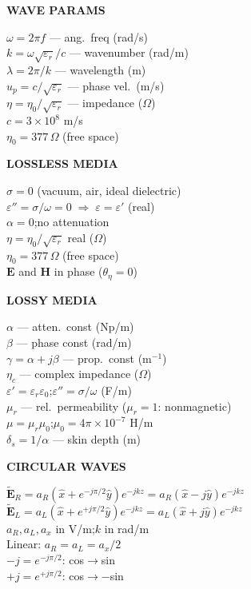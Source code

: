 \documentclass[6pt,letterpaper]{article}
\newcommand{\shead}[3]{%
  \noindent\colorbox{#1}{\parbox{\dimexpr\linewidth-2\fboxsep\relax}%
  {\color{#2}\bfseries\fontsize{6}{7}\selectfont #3}}\vspace{0.5pt}}
\begin{document}
\vfill
\noindent
\begin{minipage}[t]{0.19\linewidth}
\shead{purplebg}{purple}{WAVE PARAMS}
\begin{ebox}
$\omega=2\pi f$ --- ang.\ freq (rad/s)\\
$k=\omega\sqrt{\varepsilon_r}/c$ --- wavenumber (rad/m)\\
$\lambda=2\pi/k$ --- wavelength (m)\\
$u_p=c/\sqrt{\varepsilon_r}$ --- phase vel.\ (m/s)\\
$\eta=\eta_0/\sqrt{\varepsilon_r}$ --- impedance ($\Omega$)\\
$c=3\times10^8$ m/s\\
\textbf{$\eta_0=377\,\Omega$} (free space)
\end{ebox}
\end{minipage}\hfill
\begin{minipage}[t]{0.19\linewidth}
\shead{purplebg}{purple}{LOSSLESS MEDIA}
\begin{ebox}
$\sigma=0$ (vacuum, air, ideal dielectric)\\
$\varepsilon''=\sigma/\omega=0\;\Rightarrow\;\varepsilon=\varepsilon'$ (real)\\
$\alpha=0$;\enspace no attenuation\\
$\eta=\eta_0/\sqrt{\varepsilon_r}$ real ($\Omega$)\\
$\eta_0=377\,\Omega$ (free space)\\
$\mathbf{E}$ and $\mathbf{H}$ in phase ($\theta_\eta=0$)
\end{ebox}
\end{minipage}\hfill
\begin{minipage}[t]{0.19\linewidth}
\shead{coralbg}{coral}{LOSSY MEDIA}
\begin{ebox}
$\alpha$ --- atten.\ const (Np/m)\\
$\beta$ --- phase const (rad/m)\\
$\gamma=\alpha+j\beta$ --- prop.\ const (m$^{-1}$)\\
$\eta_c$ --- complex impedance ($\Omega$)\\
$\varepsilon'=\varepsilon_r\varepsilon_0$;\;$\varepsilon''=\sigma/\omega$ (F/m)\\
$\mu_r$ --- rel.\ permeability ($\mu_r=1$: nonmagnetic)\\
$\mu=\mu_r\mu_0$;\;$\mu_0=4\pi\times10^{-7}$ H/m\\
$\delta_s=1/\alpha$ --- skin depth (m)
\end{ebox}
\end{minipage}\hfill
\begin{minipage}[t]{0.19\linewidth}
\shead{amberbg}{amber}{CIRCULAR WAVES}
\begin{ebox}
$\tilde{\mathbf{E}}_R=a_R(\hat{x}+e^{-j\pi/2}\hat{y})e^{-jkz}=a_R(\hat{x}-j\hat{y})e^{-jkz}$\\
$\tilde{\mathbf{E}}_L=a_L(\hat{x}+e^{+j\pi/2}\hat{y})e^{-jkz}=a_L(\hat{x}+j\hat{y})e^{-jkz}$\\
$a_R,a_L,a_x$ in V/m;\;$k$ in rad/m\\
Linear: $a_R=a_L=a_x/2$\\
$-j=e^{-j\pi/2}$: cos$\to$sin\\
$+j=e^{+j\pi/2}$: cos$\to{-}$sin
\end{ebox}
\end{minipage}\hfill
\end{document}
